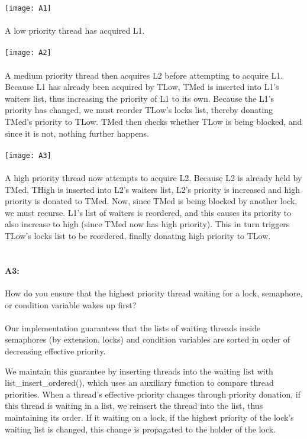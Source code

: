 \newpage
\texttt{[image: A1]}
\\
\\
A low priority thread has acquired L1.
\\
\\
\texttt{[image: A2]}
\\
\\
A medium priority thread then acquires L2 before attempting to acquire L1. Because L1 has already been acquired by TLow, TMed is inserted into L1's waiters list, thus increasing the priority of L1 to its own. Because the L1's priority has changed, we must reorder TLow's locks list, thereby donating TMed's priority to TLow. TMed then checks whether TLow is being blocked, and since it is not, nothing further happens.
\\
\\
\texttt{[image: A3]}
\\
\\
A high priority thread now attempts to acquire L2. Because L2 is already held by TMed, THigh is inserted into L2's waiters list, L2's priority is increased and high priority is donated to TMed. Now, since TMed is being blocked by another lock, we must recurse. L1's list of waiters is reordered, and this causes its priority to also increase to high (since TMed now has high priority). This in turn triggers TLow's locks list to be reordered, finally donating high priority to TLow.
\\
\\
\paragraph{A3:} %
How do you ensure that the highest priority thread waiting for a lock, semaphore, or condition variable wakes up first?
\\
\\
Our implementation guarantees that the lists of waiting threads inside semaphores (by extension, locks) and condition variables are sorted in order of decreasing effective priority.

We maintain this guarantee by inserting threads into the waiting list with list\_insert\_ordered(), which uses an auxiliary function to compare thread priorities.
When a thread's effective priority changes through priority donation, if this thread is waiting in a list, we reinsert the thread into the list, thus maintaining its order. If it waiting on a lock, if the highest priority of the lock's waiting list is changed, this change is propagated to the holder of the lock.

